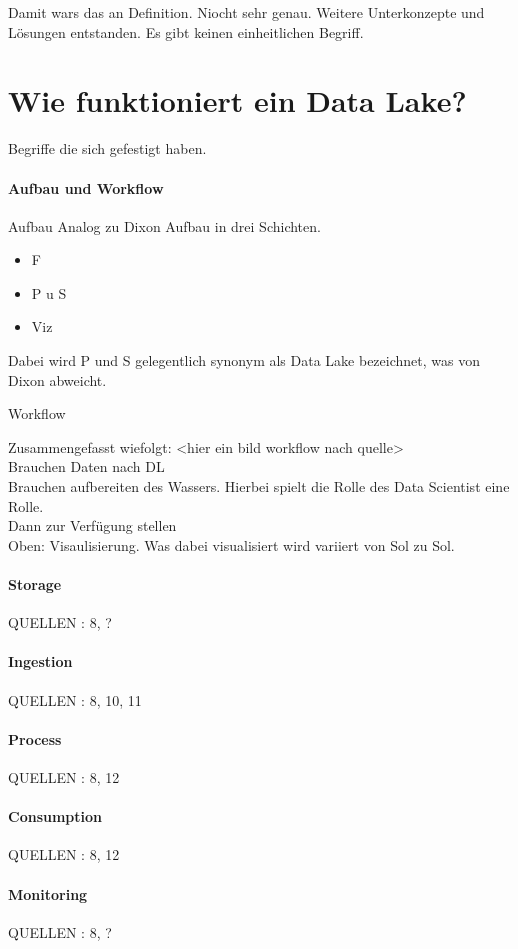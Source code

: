 \documentclass[twoside,twocolumn]{article}
\begin{document}
Damit wars das an Definition. Niocht sehr genau. Weitere Unterkonzepte und Lösungen entstanden. Es gibt keinen einheitlichen Begriff.\cite{src7}

\section{Wie funktioniert ein Data Lake?}
Begriffe die sich gefestigt haben.

\paragraph{Aufbau und Workflow}
Aufbau
Analog zu Dixon Aufbau in drei Schichten.\cite{src8} \cite{src9}
\begin{itemize}
	\item F
	\item P u S
	\item Viz
\end{itemize}
Dabei wird P und S gelegentlich synonym als Data Lake bezeichnet, was von Dixon abweicht.

Workflow

Zusammengefasst wiefolgt:
<hier ein bild workflow nach quelle>\cite{src9}\\

Brauchen Daten nach DL\\
Brauchen aufbereiten des Wassers. Hierbei spielt die Rolle des Data Scientist eine Rolle.\cite{src8}\\
Dann zur Verfügung stellen\\
Oben: Visaulisierung. Was dabei visualisiert wird variiert von Sol zu Sol.


\paragraph{Storage}
QUELLEN : 8, ?
\paragraph{Ingestion}
QUELLEN : 8, 10, 11
\paragraph{Process}
QUELLEN : 8, 12
\paragraph{Consumption}
QUELLEN : 8, 12
\paragraph{Monitoring}
QUELLEN : 8, ?
\end{document}
